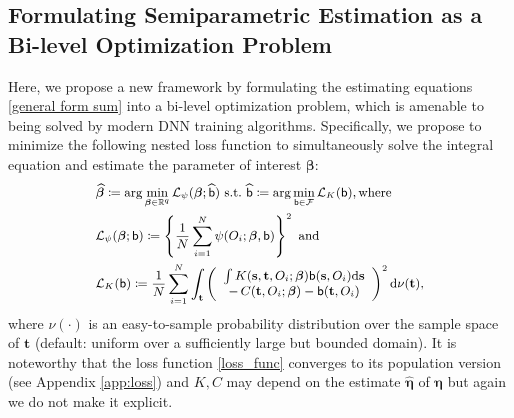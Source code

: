 \documentclass{article}
\def\calF{\mathcal{F}}
\def\sfb{\mathsf{b}}
\def\sfb{\mathsf{b}}
\theoremstyle{plain}
\theoremstyle{definition}
\theoremstyle{remark}
\def\diff{\mathrm{d}}
\def\bbeta{\boldsymbol{\beta}}
\def\hat{\widehat}
\def\st{\mathrm{s.t.}}
\def\bbR{\mathbb{R}}
\begin{document}
\subsection{Formulating Semiparametric Estimation as a Bi-level Optimization Problem}
\label{sec:loss}
 Here, we propose a new framework by formulating the estimating equations \eqref{general form sum} into a bi-level optimization problem, which is amenable to being solved by modern DNN training algorithms. Specifically, we propose to minimize the following nested loss function to simultaneously solve the integral equation and estimate the parameter of interest $\bbeta$:
\begin{equation}
\label{loss_func}
\small
\begin{split}
& \hat{\bbeta} \coloneqq \arg\min_{\bbeta \in \bbR^{q}} \mathcal{L}_{\psi} (\bbeta; \hat{\sfb}) \ \st \ \hat{\sfb} \coloneqq \arg\min_{\sfb \in \calF} \mathcal{L}_{K} (\sfb), \text{where} \\
& \mathcal{L}_{\psi} (\bbeta; \sfb) \coloneqq \left\{ \frac{1}{N} \sum_{i = 1}^{N} \psi (O_{i}; \bbeta, \sfb) \right\}^{2} \text{ and} \\
& \mathcal{L}_{K} (\sfb) \coloneqq \frac{1}{N} \sum_{i = 1}^{N} \int_{\mathbf{t}} \left( \begin{array}{c}
\int K (\mathbf{s}, \mathbf{t}, O_{i}; \bbeta) \sfb (\mathbf{s}, O_{i}) \diff \mathbf{s} \\
- \, C (\mathbf{t}, O_{i}; \bbeta) - \sfb (\mathbf{t}, O_{i})
\end{array} \right)^{2} \diff \nu (\mathbf{t}),
\end{split}
\end{equation}
where $\nu (\cdot)$ is an easy-to-sample probability distribution over the sample space of $\mathbf{t}$ (default: uniform over a sufficiently large but bounded domain). It is noteworthy that the loss function \eqref{loss_func} converges to its population version (see Appendix \ref{app:loss}) and $K, C$ may depend on the estimate $\hat{\bm{\eta}}$ of $\bm{\eta}$ but again we do not make it explicit.
\end{document}
